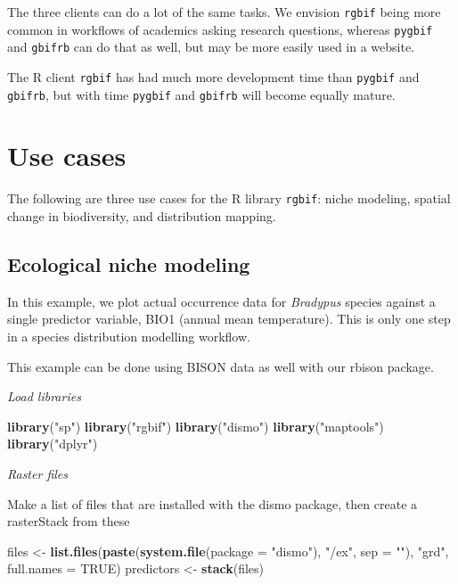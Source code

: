 \documentclass[3p]{elsarticle} %
\newenvironment{Shaded}{\begin{snugshade}}{\end{snugshade}}
\newcommand{\DataTypeTok}[1]{\textcolor[rgb]{0.13,0.29,0.53}{#1}}
\newcommand{\KeywordTok}[1]{\textcolor[rgb]{0.13,0.29,0.53}{\textbf{#1}}}
\newcommand{\NormalTok}[1]{#1}
\newcommand{\OtherTok}[1]{\textcolor[rgb]{0.56,0.35,0.01}{#1}}
\newcommand{\StringTok}[1]{\textcolor[rgb]{0.31,0.60,0.02}{#1}}
\begin{document}
The three clients can do a lot of the same tasks. We envision
\texttt{rgbif} being more common in workflows of academics asking
research questions, whereas \texttt{pygbif} and \texttt{gbifrb} can do
that as well, but may be more easily used in a website.

The R client \texttt{rgbif} has had much more development time than
\texttt{pygbif} and \texttt{gbifrb}, but with time \texttt{pygbif} and
\texttt{gbifrb} will become equally mature.

\hypertarget{use-cases}{%
\section{Use cases}\label{use-cases}}

The following are three use cases for the R library \texttt{rgbif}:
niche modeling, spatial change in biodiversity, and distribution
mapping.

\hypertarget{ecological-niche-modeling}{%
\subsection{Ecological niche modeling}\label{ecological-niche-modeling}}

In this example, we plot actual occurrence data for \emph{Bradypus}
species against a single predictor variable, BIO1 (annual mean
temperature). This is only one step in a species distribution modelling
workflow.

This example can be done using BISON data as well with our rbison
package.

\emph{Load libraries}

\begin{Shaded}
\begin{Highlighting}[]
\KeywordTok{library}\NormalTok{(}\StringTok{"sp"}\NormalTok{)}
\KeywordTok{library}\NormalTok{(}\StringTok{"rgbif"}\NormalTok{)}
\KeywordTok{library}\NormalTok{(}\StringTok{"dismo"}\NormalTok{)}
\KeywordTok{library}\NormalTok{(}\StringTok{"maptools"}\NormalTok{)}
\KeywordTok{library}\NormalTok{(}\StringTok{"dplyr"}\NormalTok{)}
\end{Highlighting}
\end{Shaded}

\emph{Raster files}

Make a list of files that are installed with the dismo package, then
create a rasterStack from these

\begin{Shaded}
\begin{Highlighting}[]
\NormalTok{files <{-}}\StringTok{ }\KeywordTok{list.files}\NormalTok{(}\KeywordTok{paste}\NormalTok{(}\KeywordTok{system.file}\NormalTok{(}\DataTypeTok{package =} \StringTok{"dismo"}\NormalTok{), }\StringTok{"/ex"}\NormalTok{, }\DataTypeTok{sep =} \StringTok{""}\NormalTok{),}
                    \StringTok{"grd"}\NormalTok{, }\DataTypeTok{full.names =} \OtherTok{TRUE}\NormalTok{)}
\NormalTok{predictors <{-}}\StringTok{ }\KeywordTok{stack}\NormalTok{(files)}
\end{Highlighting}
\end{Shaded}
\end{document}
